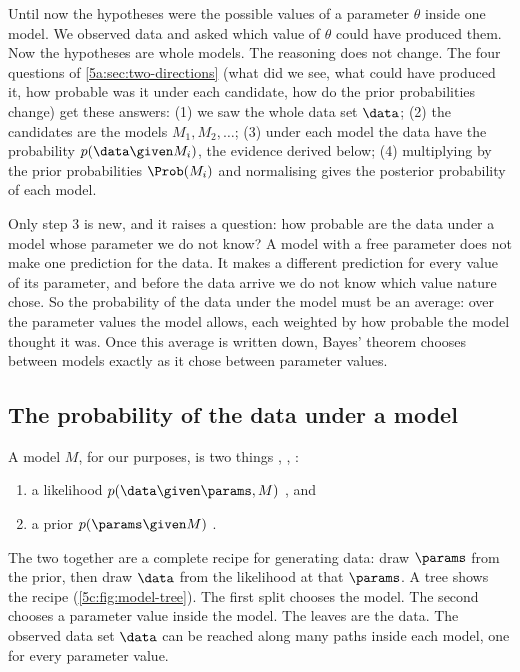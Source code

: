 Until now the hypotheses were the possible values of a parameter $\theta$ inside one
model. We observed data and asked which value of $\theta$ could have produced them.
Now the hypotheses are whole models. The reasoning does not change. The four questions of
\cref{5a:sec:two-directions} (what did we see, what could have produced it, how
probable was it under each candidate, how do the prior probabilities change)
get these answers: (1) we saw the whole data set $\data$; (2) the candidates are
the models $M_1,M_2,\dots$; (3) under each model the data have the probability
$p(\data\given M_i)$, the evidence derived below; (4) multiplying by the prior
probabilities $\Prob(M_i)$ and normalising gives the posterior probability of
each model.

Only step 3 is new, and it raises a question: how probable are the data under a
model whose parameter we do not know? A model with a free parameter does not make
one prediction for the data. It makes a different prediction for every value of its
parameter, and before the data arrive we do not know which value nature chose. So
the probability of the data under the model must be an average: over the parameter
values the model allows, each weighted by how probable the model thought it was.
Once this average is written down, Bayes' theorem chooses between models exactly as
it chose between parameter values.

\subsection{The probability of the data under a model}
\label{5c:sec:evidence}

A model $M$, for our purposes, is two things
, , \cite[\S4.1]{Trotta2008}:
\begin{enumerate}[itemsep=1pt,leftmargin=1.6em]
  \item a likelihood $p(\data\given\params,M)$ , and
  \item a prior $p(\params\given M)$ .
\end{enumerate}
The two together are a complete recipe for generating data: draw $\params$ from the
prior, then draw $\data$ from the likelihood at that $\params$. A tree shows the
recipe (\cref{5c:fig:model-tree}). The first split chooses the model. The second
chooses a parameter value inside the model. The leaves are the data. The
observed data set $\data$ can be reached along many paths inside each model, one
for every parameter value.

